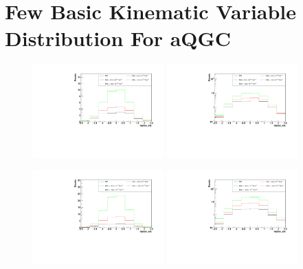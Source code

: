\section{Few Basic Kinematic Variable Distribution For aQGC}
\newpage
\begin{figure}[h]
  \begin{center}
	\includegraphics[width=0.45\textwidth]{Plots/aQGC_kinematics/lepton_eta_FM0.pdf}%
	\includegraphics[width=0.45\textwidth]{Plots/aQGC_kinematics/lepton_eta_FM0_log.pdf}\\	
    \caption{}
  \end{center}
\end{figure}

\begin{figure}[h]
  \begin{center}
	\includegraphics[width=0.45\textwidth]{Plots/aQGC_kinematics/lepton_eta_FM1.pdf}%
	\includegraphics[width=0.45\textwidth]{Plots/aQGC_kinematics/lepton_eta_FM1_log.pdf}\\				
    \caption{}
  \end{center}
\end{figure}

